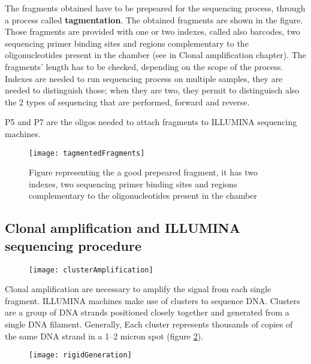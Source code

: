 
The fragments obtained have to be prepeared for the sequencing process, through a process called \textbf{tagmentation}. The obtained fragments are shown in the figure. Those fragments are provided with one or two indexes, called also barcodes, two sequencing primer binding sites and regions complementary to the oligonucleotides present in the chamber (see in Clonal amplification chapter). The fragments' length has to be checked, depending on the scope of the process. Indexes are needed to run sequencing process on multiple samples, they are needed to distinguish those; when they are two, they permit to distinguisch also the 2 types of sequencing that are performed, forward and reverse.

P5 and P7 are the oligos needed to attach fragments to ILLUMINA sequencing machines.

\begin{figure}[h]
\caption{Figure representing the a good prepeared fragment, it has two indexes, two sequencing primer binding sites and regions complementary to the oligonucleotides present in the chamber}
\centering
\texttt{[image: tagmentedFragments]}
\label{}
\end{figure}


\subsection{Clonal amplification and ILLUMINA sequencing procedure}

\begin{figure}[h]
\caption{}
\centering
\texttt{[image: clusterAmplification]}
\label{clusters}
\end{figure}

Clonal amplification are necessary to amplify the signal from each single fragment.
ILLUMINA machines make use of clusters to sequence DNA. Clusters are a group of DNA
strands positioned closely together and generated from a single DNA filament. Generally, Each cluster represents thousands of copies of the same DNA strand in a 1–2 micron spot (figure \ref{clusters}).

\begin{figure}[h]
\caption{}
\centering
\texttt{[image: rigidGeneration]}
\label{rigid}
\end{figure}

